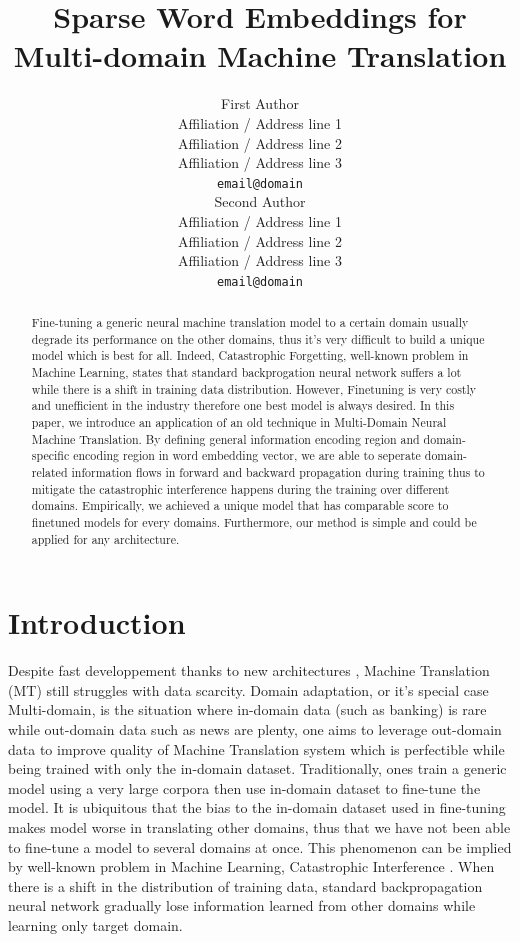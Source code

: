 \documentclass[11pt,a4paper]{article}
\title{Sparse Word Embeddings for Multi-domain Machine Translation}
\author{First Author \\%
  Affiliation / Address line 1 \\
  Affiliation / Address line 2 \\
  Affiliation / Address line 3 \\
  {\tt email@domain} \\\And
  Second Author \\
  Affiliation / Address line 1 \\
  Affiliation / Address line 2 \\
  Affiliation / Address line 3 \\
  {\tt email@domain} \\}
\date{}
\newcommand{\fyTodo}[1]{\Todo[FY:]{\textcolor{orange}{#1}}}
\newcommand{\fyDone}[1]{\done[FY]\Todo[FY:]{\textcolor{orange}{#1}}}
\begin{document}
\maketitle

\fyTodo{s/naacl/EMNLP/g}
\fyTodo{Too long, selfcontained, noref, rewrite}
\begin{abstract}
Fine-tuning a generic neural machine translation model to a certain domain usually degrade its performance on the other domains, thus it's very difficult to build a unique model which is best for all. Indeed, Catastrophic Forgetting, well-known problem in Machine Learning, states that standard backprogation neural network suffers a lot while there is a shift in training data distribution. However, Finetuning is very costly and unefficient in the industry therefore one best model is always desired. In this paper, we introduce an application of an old technique \cite{Daume07frustratingly} in Multi-Domain Neural Machine Translation. By defining general information encoding region and domain-specific encoding region in word embedding vector, we are able to seperate domain-related information flows in forward and backward propagation during training thus to
mitigate the catastrophic interference happens during the training over different domains. Empirically, we achieved a unique model that has comparable score to finetuned models for every domains. Furthermore, our method is simple and could be applied for any architecture.
\end{abstract}

\section{Introduction \label{sec:introduction}}
\fyDone{Merge refs and order chronologically}
\fyTodo{Homogeneize cite keys, avoid arxiv}

Despite fast developpement thanks to new architectures \cite{Kalchbrenner13recurrent, Sutskever2014Sequence, bahdanau2014neural, Vaswani17attention}, Machine Translation (MT) still struggles with data scarcity. Domain adaptation, or it's special case Multi-domain, is the situation where in-domain data (such as banking) is rare while out-domain data such as news are plenty, one aims to leverage out-domain data to improve quality of Machine Translation system which is perfectible while being trained with only the in-domain dataset. Traditionally, ones train a generic model using a very large corpora then use in-domain dataset to fine-tune the model. It is ubiquitous that the bias to the in-domain dataset used in fine-tuning makes model worse in translating other domains, thus that we have not been able to fine-tune a model to several domains at once. This phenomenon can be implied by well-known problem in Machine Learning, Catastrophic Interference \cite{McCloskey1989Catastrophic}. When there is a shift in the distribution of training data, standard backpropagation neural network\fyTodo{Generic ? backprop or NN problem ?} gradually lose information learned from other domains while learning only target domain.
\end{document}
